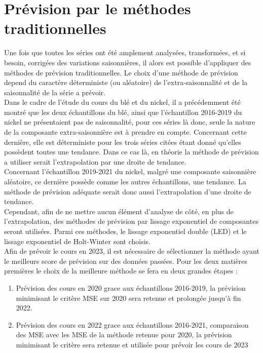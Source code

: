 \section{Prévision par le méthodes traditionnelles}
Une fois que toutes les séries ont été amplement analysées, transformées, et si besoin, corrigées des variations saisonnières, il alors est possible d'appliquer des 
méthodes de prévision traditionnelles. Le choix d'une méthode de prévision depend du caractère déterministe (ou aléatoire) de l'extra-saisonnalité et de la saisonnalité de
la série a prévoir. \\[11pt]
Dans le cadre de l'étude du cours du blé et du nickel, il a précédemment été montré que les deux échantillons du blé, ainsi que l'échantillon 2016-2019 
du nickel ne présentaient pas de saisonnalité, pour ces séries là donc, seule la nature de la composante extra-saisonnière est à prendre en compte. Concernant cette 
dernière, elle est déterministe pour les trois séries citées étant donné qu'elles possèdent toutes une tendance. Dans ce cas là, en théorie la méthode de prévision a 
utiliser serait l'extrapolation par une droite de tendance.\\[11pt]
Concernant l'échantillon 2019-2021 du nickel, malgré une composante saisonnière aléatoire, ce dernière possède comme les autres échantillons, une tendance. La méthode de 
prévision adéquate serait donc aussi l'extrapolation d'une droite de tendance.\\[11pt]
Cependant, afin de ne mettre aucun élément d'analyse de côté, en plus de l'extrapolation, des méthodes de prévision par lissage exponentiel de composantes seront 
utilisées. Parmi ces méthodes, le lissage exponentiel double (LED) et le lissage exponentiel de Holt-Winter sont choisis. \\[11pt]
Afin de prévoir le cours en 2023, il est nécessaire de sélectionner la méthode ayant le meilleurs score de prévision sur des données passées. Pour les deux matières 
premières le choix de la meilleure méthode se fera en deux grandes étapes :
\begin{enumerate}
    \item Prévision des cours en 2020 grace aux échantillons 2016-2019, la prévision minimisant le critère MSE sur 2020 sera retenue et prolongée jusqu'à fin 2022.
    \item Prévision des cours en 2022 grace aux échantillons 2016-2021, comparaison des MSE avec les MSE de la méthode retenue pour 2020, la prévision minimisant le 
            critère sera retenue et utilisée pour prévoir les cours de 2023 
\end{enumerate}

